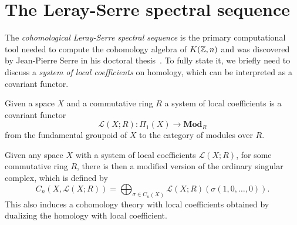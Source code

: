 \documentclass[../main.tex]{subfiles}
\begin{document}
\section{The Leray-Serre spectral sequence}
The \emph{cohomological Leray-Serre spectral sequence} is the primary computational tool
needed to compute the cohomology algebra of \( K(\mathbb{Z}, n) \) and was
discovered by Jean-Pierre Serre in his doctoral thesis~\cite[]{Ser51}.
To fully state it, we briefly need to discuss a \emph{system of local
coefficients} on homology, which can be interpreted as a covariant
functor.
\begin{definition}
    Given a space \( X \) and a commutative ring \( R \) a system of local coefficients is a covariant
    functor \[\mathbb{\mathcal{L}}(X;R):\Pi_1(X)\rightarrow \textbf{Mod}_R \]
    from the fundamental groupoid of \( X \) to the category of modules
    over \( R \).
\end{definition}
Given any space \( X \) with a system of local coefficients \( \mathcal{L}(X;R)\),
for some commutative ring \( R \), there is then a modified version of the ordinary singular complex,
which is defined by
\begin{equation}
    C_n(X,\mathcal{L}(X;R)) = \bigoplus_{\sigma\in C_n(X)} \mathcal{L}(
    X;R)(\sigma(1,0,\ldots,0)).
\end{equation}
This also induces a cohomology theory with local coefficients
obtained by dualizing the homology with local coefficient.
\end{document}
